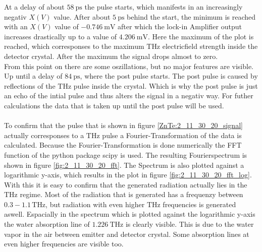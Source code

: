 At a delay of about $\SI{58}{\pico\second}$ the pulse starts, which manifests in an increasingly negativ $X(V)$ value.
After about $\SI{5}{\pico\second}$ behind the start, the minimum is reached with an $X(V)$ value of $\SI{-0.746}{\milli\V}$ after which the lock-in Amplifier output increases drastically up to a value of $\SI{4.206}{\milli\V}$.
Here the maximum of the plot is reached, which corresponses to the maximum $\si{\tera\hertz}$ electricfield strength inside the detector crystal.
After the maximum the signal drops almost to zero.
\\
From this point on there are some oszillations, but no major features are visible. %
Up until a delay of $\SI{84}{\pico\second}$, where the post pulse starts.
The post pulse is caused by reflections of the $\si{\tera\hertz}$ pulse inside the crystal.
Which is why the post pulse is just an echo of the intial pulse and thus alters the signal in a negativ way.
For futher calculations the data that is taken up until the post pulse will be used.
\\\\
\FloatBarrier
To confirm that the pulse that is shown in figure \ref{ZnTe:2_11_30_20_signal} actually corresponses to a $\si{\tera\hertz}$ pulse a Fourier-Transformation of the data is calculated. %
Because the Fourier-Transformation is done numerically the FFT function of the python package scipy \cite{scipy} is used.
The resulting Fourierspectrum is shown in figure \ref{fig:2_11_30_20_fft}.
The Spectrum is also plotted against a logarithmic y-axis, which results in the plot in figure \ref{fig:2_11_30_20_fft_log}.
\\
With this it is easy to confirm that the generated radiation actually lies in the $\si{\tera\hertz}$ regime.
Most of the radiation that is generated has a frequenzy between $0.3-1.1\,\si{\tera\hertz}$, but radiation with even higher $\si{\tera\hertz}$ frequencies is generated aswell.
Espacially in the spectrum which is plotted against the logarithmic y-axis the water absorption line of $\SI{1.226}{\tera\hertz}$ is clearly visible.
This is due to the water vapor in the air between emitter and detector crystal.
Some absorption lines at even higher frequencies are visible too.
